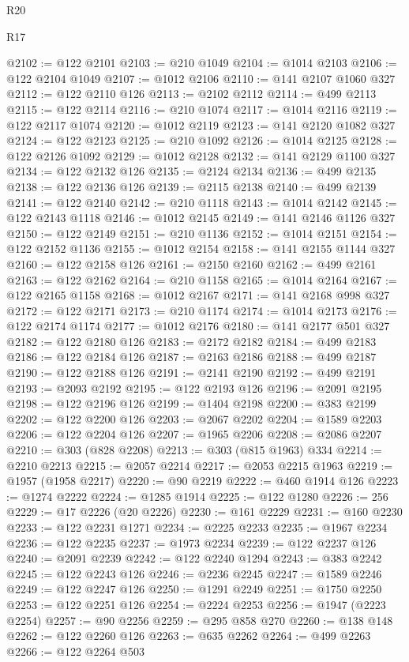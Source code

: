 \begin{lexlean}{R20}
\begin{lexlean}{R17}
\begin{coremodule}
{{{{{{{{{{{{{{{{{{{{{{{{{{{{{{{{{{{{{{{{{{{{{{{{{{{{{{{{{{{{{{{{{{{{{{{{{{{{{{{{{{{{{{{{{{{{{{{{{{{{{{{{{{{@2102 := @122 @2101
@2103 := @210 @1049
@2104 := @1014 @2103
@2106 := @122 @2104 @1049
@2107 := @1012 @2106
@2110 := @141 @2107 @1060 @327
@2112 := @122 @2110 @126
@2113 := @2102 @2112
@2114 := @499 @2113
@2115 := @122 @2114
@2116 := @210 @1074
@2117 := @1014 @2116
@2119 := @122 @2117 @1074
@2120 := @1012 @2119
@2123 := @141 @2120 @1082 @327
@2124 := @122 @2123
@2125 := @210 @1092
@2126 := @1014 @2125
@2128 := @122 @2126 @1092
@2129 := @1012 @2128
@2132 := @141 @2129 @1100 @327
@2134 := @122 @2132 @126
@2135 := @2124 @2134
@2136 := @499 @2135
@2138 := @122 @2136 @126
@2139 := @2115 @2138
@2140 := @499 @2139
@2141 := @122 @2140
@2142 := @210 @1118
@2143 := @1014 @2142
@2145 := @122 @2143 @1118
@2146 := @1012 @2145
@2149 := @141 @2146 @1126 @327
@2150 := @122 @2149
@2151 := @210 @1136
@2152 := @1014 @2151
@2154 := @122 @2152 @1136
@2155 := @1012 @2154
@2158 := @141 @2155 @1144 @327
@2160 := @122 @2158 @126
@2161 := @2150 @2160
@2162 := @499 @2161
@2163 := @122 @2162
@2164 := @210 @1158
@2165 := @1014 @2164
@2167 := @122 @2165 @1158
@2168 := @1012 @2167
@2171 := @141 @2168 @998 @327
@2172 := @122 @2171
@2173 := @210 @1174
@2174 := @1014 @2173
@2176 := @122 @2174 @1174
@2177 := @1012 @2176
@2180 := @141 @2177 @501 @327
@2182 := @122 @2180 @126
@2183 := @2172 @2182
@2184 := @499 @2183
@2186 := @122 @2184 @126
@2187 := @2163 @2186
@2188 := @499 @2187
@2190 := @122 @2188 @126
@2191 := @2141 @2190
@2192 := @499 @2191
@2193 := @2093 @2192
@2195 := @122 @2193 @126
@2196 := @2091 @2195
@2198 := @122 @2196 @126
@2199 := @1404 @2198
@2200 := @383 @2199
@2202 := @122 @2200 @126
@2203 := @2067 @2202
@2204 := @1589 @2203
@2206 := @122 @2204 @126
@2207 := @1965 @2206
@2208 := @2086 @2207
@2210 := @303 (@828 @2208)
@2213 := @303 (@815 @1963) @334
@2214 := @2210 @2213
@2215 := @2057 @2214
@2217 := @2053 @2215 @1963
@2219 := @1957 (@1958 @2217)
@2220 := @90 @2219
@2222 := @460 @1914 @126
@2223 := @1274 @2222
@2224 := @1285 @1914
@2225 := @122 @1280
@2226 := 256
@2229 := @17 @2226 (@20 @2226)
@2230 := @161 @2229
@2231 := @160 @2230
@2233 := @122 @2231 @1271
@2234 := @2225 @2233
@2235 := @1967 @2234
@2236 := @122 @2235
@2237 := @1973 @2234
@2239 := @122 @2237 @126
@2240 := @2091 @2239
@2242 := @122 @2240 @1294
@2243 := @383 @2242
@2245 := @122 @2243 @126
@2246 := @2236 @2245
@2247 := @1589 @2246
@2249 := @122 @2247 @126
@2250 := @1291 @2249
@2251 := @1750 @2250
@2253 := @122 @2251 @126
@2254 := @2224 @2253
@2256 := @1947 (@2223 @2254)
@2257 := @90 @2256
@2259 := @295 @858 @270
@2260 := @138 @148
@2262 := @122 @2260 @126
@2263 := @635 @2262
@2264 := @499 @2263
@2266 := @122 @2264 @503
}}}}}}}}}}}}}}}}}}}}}}}}}}}}}}}}}}}}}}}}}}}}}}}}}}}}}}}}}}}}}}}}}}}}}}}}}}}}}}}}}}}}}}}}}}}}}}}}}}}}}}}}}}}
\end{coremodule}
\end{lexlean}
\end{lexlean}
